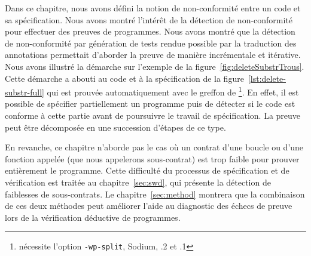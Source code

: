 Dans ce chapitre, nous avons défini la notion de non-conformité entre un code
et sa spécification.
Nous avons montré l'intérêt de la détection de non-conformité pour effectuer
des preuves de programmes.
Nous avons montré que la détection de non-conformité par génération de tests
rendue possible par la traduction des annotations permettait d'aborder la preuve
de manière incrémentale et itérative.
Nous avons illustré la démarche sur l'exemple de la
figure~\ref{fig:deleteSubstrTrous}.
Cette démarche a abouti au code et à la spécification de la
figure~\ref{lst:delete-substr-full}
qui est prouvée automatiquement avec le greffon \Wp de \framac
\footnote{nécessite l'option \texttt{-wp-split}, \framac Sodium, .2
  et .1}.
En effet, il est possible de spécifier partiellement un programme puis de
détecter si le code est conforme à cette partie avant de poursuivre le travail
de spécification.
La preuve peut être décomposée en une succession d'étapes de ce type.

En revanche, ce chapitre n'aborde pas le cas où un contrat d'une boucle ou
d'une fonction appelée (que nous appelerons sous-contrat) est trop faible pour
prouver entièrement le programme.
Cette difficulté du processus de spécification et de vérification est traitée au
chapitre~\ref{sec:swd}, qui présente la détection de faiblesses de
sous-contrats.
Le chapitre~\ref{sec:method} montrera que la combinaison de ces deux méthodes
peut améliorer l'aide au diagnostic des échecs de preuve lors de la vérification
déductive de programmes.
